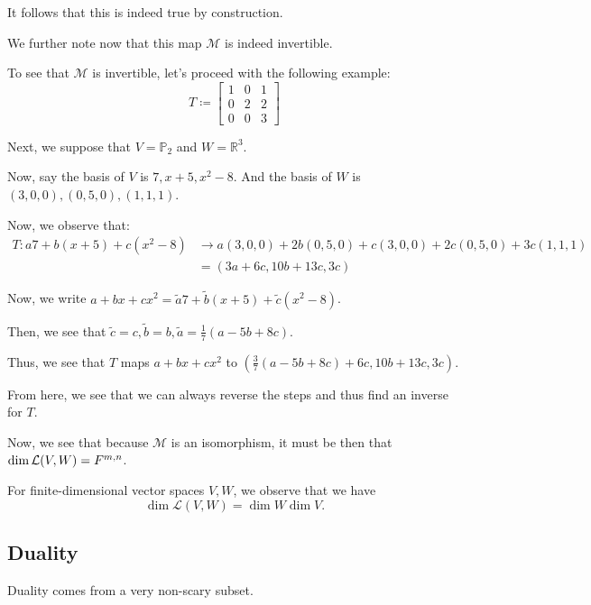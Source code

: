 \documentclass[openany]{book}
\newcommand{\RR}{\mathbb{R}}
\begin{document}
It follows that this is indeed true by construction.

We further note now that this map $\mathcal M$ is indeed invertible.

\begin{example}
	To see that $\mathcal M $ is invertible, let's proceed with the following example:
	\begin{equation*}
		T \coloneq
		\begin{bmatrix}
			1 & 0 & 1 \\ 0 & 2 & 2 \\ 0 & 0 & 3 
		\end{bmatrix}
	\end{equation*}

	Next, we suppose that $V = \mathbb{P}_{2}$ and $W = \RR^{3}$.
	
	Now, say the basis of $V$ is $7, x+5, x^{2} - 8$. And the basis of $W$ is $(3,0,0), (0,5,0), (1,1,1)$.
	
	Now, we observe that:
	\begin{align*}
		T : a7 + b(x+5) + c(x^{2} - 8) &\rightarrow a(3,0,0) + 2b(0,5,0) + c(3,0,0) + 2c(0,5,0) + 3c(1,1,1) \\
		&= (3a + 6c, 10b + 13c, 3c)
	\end{align*}

	Now, we write $a + bx + cx^{2} = \tilde{a}7 + \tilde{b}(x+5) + \tilde{c}(x^{2} - 8)$.
	
	Then, we see that $\tilde{c} = c, \tilde{b} = b, \tilde a = \frac{1}{7}(a - 5b + 8c)$.
	
	Thus, we see that $T$ maps $a+bx+cx^{2}$ to $(\frac{3}{7} (a-5b+8c) + 6c, 10b + 13c, 3c)$.
	
	From here, we see that we can always reverse the steps and thus find an inverse for $T$.
\end{example}

Now, we see that because $\mathcal M$ is an isomorphism, it must be then that $\dim \mathcal L(V,W) = \mathbb \mathbb{F}^{m,n}$.
\begin{thm}
	For finite-dimensional vector spaces $V,W$, we observe that we have
	\begin{equation*}
		\dim \mathcal L(V,W) = \dim W \dim V.
	\end{equation*}
\end{thm}

\subsection{Duality}
Duality comes from a very non-scary subset.
\end{document}
